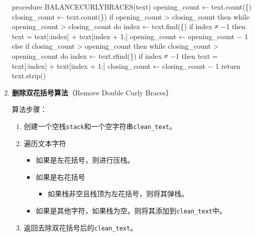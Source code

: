 \documentclass[
]{article}
\newenvironment{Shaded}{}{}
\newcommand{\NormalTok}[1]{#1}
\begin{document}
\begin{enumerate}
        \begin{Shaded}
          \begin{Highlighting}[]
            \NormalTok{procedure BALANCECURLYBRACES(text)}
            \NormalTok{	opening\_count ← text.count(\textquotesingle{}\{\textquotesingle{})}
            \NormalTok{	closing\_count ← text.count(\textquotesingle{}\}\textquotesingle{})}
            \NormalTok{	if opening\_count \textgreater{} closing\_count then}
            \NormalTok{		while opening\_count \textgreater{} closing\_count do}
            \NormalTok{			index ← text.find(\textquotesingle{}\{\textquotesingle{})}
            \NormalTok{			if index ≠ −1 then}
            \NormalTok{				text = text[:index] + text[index + 1:]}
            \NormalTok{				opening\_count ← opening\_count − 1}
            \NormalTok{	else if closing\_count \textgreater{} opening\_count then}
            \NormalTok{		while closing\_count \textgreater{} opening\_count do}
            \NormalTok{			index ← text.rfind(\textquotesingle{}\}\textquotesingle{})}
            \NormalTok{			if index ≠ −1 then}
            \NormalTok{				text = text[:index] + text[index + 1:]}
            \NormalTok{				closing\_count ← closing\_count − 1}
            \NormalTok{	return text.strip()}
          \end{Highlighting}
        \end{Shaded}
  \item
        \textbf{删除双花括号算法}（Remove Double Curly Braces）

        算法步骤：

        \begin{enumerate}
          \def\labelenumii{\arabic{enumii}.}
          \item
                创建一个空栈\texttt{stack}和一个空字符串\texttt{clean\_text}。
          \item
                遍历文本字符

                \begin{itemize}
                  \item
                        如果是左花括号，则进行压栈。
                  \item
                        如果是右花括号

                        \begin{itemize}
                          \item
                                如果栈非空且栈顶为左花括号，则将其弹栈。
                        \end{itemize}
                  \item
                        如果是其他字符，如果栈为空，则将其添加到\texttt{clean\_text}中。
                \end{itemize}
          \item
                返回去除双花括号后的\texttt{clean\_text}。
        \end{enumerate}


\end{enumerate}
\end{document}
